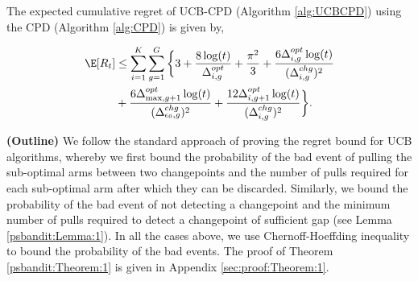 \begin{customtheorem}{1}
\label{psbandit:Theorem:1}
The expected cumulative regret of UCB-CPD (Algorithm \ref{alg:UCBCPD}) using the CPD (Algorithm \ref{alg:CPD}) is given by,

\begin{align*}
\E[R_t]  &\leq \sum_{i=1}^{K}\sum_{g=1}^{G} \bigg\lbrace 3 + \dfrac{8\log(t)}{\Delta^{opt}_{i,g}} + \dfrac{\pi^2}{3} + \dfrac{6\Delta^{opt}_{i,g}\log(t)}{(\Delta^{chg}_{i,g})^2} \\
& + \dfrac{6\Delta^{opt}_{\max,g+1}\log(t)}{(\Delta^{chg}_{\epsilon_0,g})^{2}} + \dfrac{12\Delta^{opt}_{i,g+1}\log(t)}{(\Delta^{chg}_{i,g})^{2}}\bigg\rbrace.
\end{align*}

\end{customtheorem}

\begin{customproof}{3} \textbf{(Outline)}
We follow the standard approach of proving the regret bound for UCB algorithms, whereby we first bound the probability of the bad event of pulling the sub-optimal arms between two changepoints and the number of pulls required for each sub-optimal arm after which they can be discarded. Similarly, we bound the probability of the bad event of not detecting a changepoint and the minimum number of pulls required to detect a  changepoint of sufficient gap (see Lemma \ref{psbandit:Lemma:1}). In all the cases above, we use Chernoff-Hoeffding inequality to bound the probability of the bad events. The proof of Theorem \ref{psbandit:Theorem:1} is given in Appendix \ref{sec:proof:Theorem:1}.
\end{customproof}


